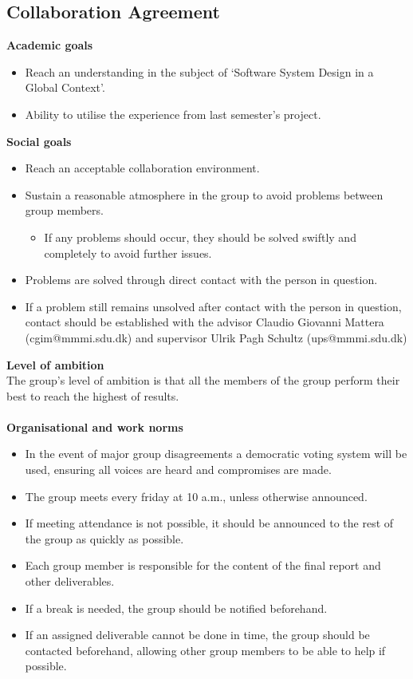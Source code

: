 \subsection{Collaboration Agreement}
\textbf{Academic goals}
\begin{itemize}
	\item Reach an understanding in the subject of ‘Software System Design in a Global Context’.
	\item Ability to utilise the experience from last semester’s project.
\end{itemize}
\textbf{Social goals}
\begin{itemize}
	\item Reach an acceptable collaboration environment.
	\item Sustain a reasonable atmosphere in the group to avoid problems between group members.
	\begin{itemize}
		\item If any problems should occur, they should be solved swiftly and completely to avoid further issues.
	\end{itemize}
	\item Problems are solved through direct contact with the person in question.
	\item If a problem still remains unsolved after contact with the person in question, contact should be established with the advisor Claudio Giovanni Mattera (cgim@mmmi.sdu.dk) and 	supervisor Ulrik Pagh Schultz (ups@mmmi.sdu.dk)
\end{itemize}
\textbf{Level of ambition}
\\
The group's level of ambition is that all the members of the group perform their best to reach the highest of results.
\\
\\
\textbf{Organisational and work norms}
\begin{itemize}
	\item In the event of major group disagreements a democratic voting system will be used, ensuring all voices are heard and compromises are made.
	\item The group meets every friday at 10 a.m., unless otherwise announced.
	\item If meeting attendance is not possible, it should be announced to the rest of the group as quickly as possible.
	\item Each group member is responsible for the content of the final report and other deliverables.
	\item If a break is needed, the group should be notified beforehand.
	\item If an assigned deliverable cannot be done in time, the group should be contacted beforehand, allowing other group members to be able to help if possible.
\end{itemize}
